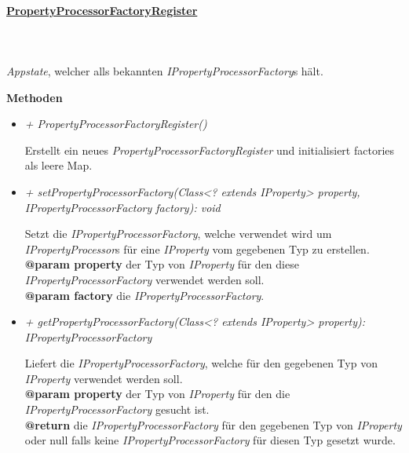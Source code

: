     \pagebreak
    \paragraph{\underline{PropertyProcessorFactoryRegister}} \mbox{}\\
    \\
    \textit{Appstate}, welcher alls bekannten \textit{IPropertyProcessorFactory}s hält.\par

        \textbf{Methoden}
        \begin{itemize}
            \item \textit{+ PropertyProcessorFactoryRegister()}
                \begin{leftbar}[0.9\linewidth]
                    Erstellt ein neues \textit{PropertyProcessorFactoryRegister} und initialisiert factories als leere Map.
                \end{leftbar}
            \item \textit{+ setPropertyProcessorFactory(Class<? extends IProperty> property, IPropertyProcessorFactory factory): void}
                \begin{leftbar}[0.9\linewidth]
                    Setzt die \textit{IPropertyProcessorFactory}, welche verwendet wird um \textit{IPropertyProcessor}s für eine \textit{IProperty} vom gegebenen Typ
                    zu erstellen.\\
                    \textbf{@param property} der Typ von \textit{IProperty} für den diese \textit{IPropertyProcessorFactory} verwendet werden soll.\\
                    \textbf{@param factory} die \textit{IPropertyProcessorFactory}.
                \end{leftbar}
            \item \textit{+ getPropertyProcessorFactory(Class<? extends IProperty> property): IPropertyProcessorFactory}
                \begin{leftbar}[0.9\linewidth]
                    Liefert die \textit{IPropertyProcessorFactory}, welche für den gegebenen Typ von \textit{IProperty} verwendet werden soll.\\
                    \textbf{@param property} der Typ von \textit{IProperty} für den die \textit{IPropertyProcessorFactory} gesucht ist.\\
                    \textbf{@return} die \textit{IPropertyProcessorFactory} für den gegebenen Typ von \textit{IProperty} oder null falls keine
                    \textit{IPropertyProcessorFactory} für diesen Typ gesetzt wurde.
                \end{leftbar}
        \end{itemize}